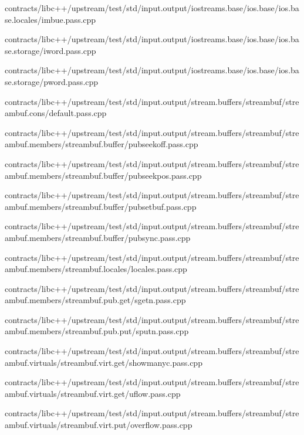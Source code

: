 \begin{DoxyCompactItemize}
contracts/libc++/upstream/test/std/input.\+output/iostreams.\+base/ios.\+base/ios.\+base.\+locales/imbue.\+pass.\+cpp\item 
contracts/libc++/upstream/test/std/input.\+output/iostreams.\+base/ios.\+base/ios.\+base.\+storage/iword.\+pass.\+cpp\item 
contracts/libc++/upstream/test/std/input.\+output/iostreams.\+base/ios.\+base/ios.\+base.\+storage/pword.\+pass.\+cpp\item 
contracts/libc++/upstream/test/std/input.\+output/stream.\+buffers/streambuf/streambuf.\+cons/default.\+pass.\+cpp\item 
contracts/libc++/upstream/test/std/input.\+output/stream.\+buffers/streambuf/streambuf.\+members/streambuf.\+buffer/pubseekoff.\+pass.\+cpp\item 
contracts/libc++/upstream/test/std/input.\+output/stream.\+buffers/streambuf/streambuf.\+members/streambuf.\+buffer/pubseekpos.\+pass.\+cpp\item 
contracts/libc++/upstream/test/std/input.\+output/stream.\+buffers/streambuf/streambuf.\+members/streambuf.\+buffer/pubsetbuf.\+pass.\+cpp\item 
contracts/libc++/upstream/test/std/input.\+output/stream.\+buffers/streambuf/streambuf.\+members/streambuf.\+buffer/pubsync.\+pass.\+cpp\item 
contracts/libc++/upstream/test/std/input.\+output/stream.\+buffers/streambuf/streambuf.\+members/streambuf.\+locales/locales.\+pass.\+cpp\item 
contracts/libc++/upstream/test/std/input.\+output/stream.\+buffers/streambuf/streambuf.\+members/streambuf.\+pub.\+get/sgetn.\+pass.\+cpp\item 
contracts/libc++/upstream/test/std/input.\+output/stream.\+buffers/streambuf/streambuf.\+members/streambuf.\+pub.\+put/sputn.\+pass.\+cpp\item 
contracts/libc++/upstream/test/std/input.\+output/stream.\+buffers/streambuf/streambuf.\+virtuals/streambuf.\+virt.\+get/showmanyc.\+pass.\+cpp\item 
contracts/libc++/upstream/test/std/input.\+output/stream.\+buffers/streambuf/streambuf.\+virtuals/streambuf.\+virt.\+get/uflow.\+pass.\+cpp\item 
contracts/libc++/upstream/test/std/input.\+output/stream.\+buffers/streambuf/streambuf.\+virtuals/streambuf.\+virt.\+put/overflow.\+pass.\+cpp\end{DoxyCompactItemize}
